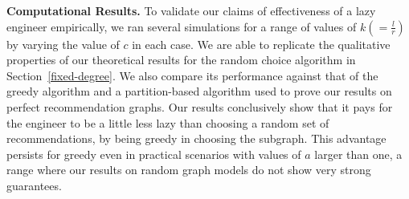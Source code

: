 \noindent
{\bf Computational Results.}
To validate our claims of effectiveness of a lazy engineer empirically, we ran several simulations for a range of values of $k (= \frac{l}{r})$ by varying the value of $c$ in each case. We are able to replicate the qualitative properties of our theoretical results for the random choice algorithm in Section~\ref{fixed-degree}. We also compare its performance against that of the greedy algorithm and a partition-based algorithm used to prove our results on perfect recommendation graphs. Our results conclusively show that it pays for the engineer to be a little less lazy than choosing a random set of recommendations, by being greedy in choosing the subgraph. This advantage persists for greedy even in practical scenarios with values of $a$ larger than one, a range where our results on random graph models do not show very strong guarantees. \vs


